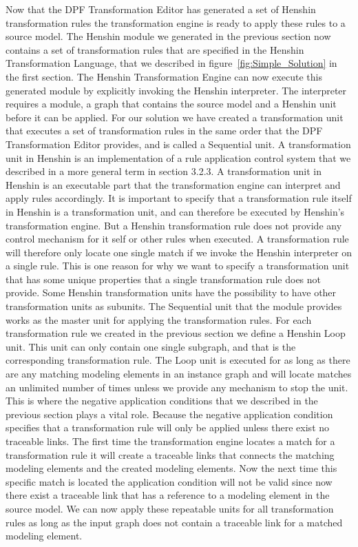 Now that the DPF Transformation Editor has generated a set of Henshin
transformation rules the transformation engine is ready to apply these rules to
a source model. The Henshin module we generated in the previous section now contains a set of
transformation rules that are specified in the Henshin Transformation Language,
that we described in figure~\ref{fig:Simple_Solution} in the first section. The
Henshin Transformation Engine can now execute this generated module by
explicitly invoking the Henshin interpreter. The interpreter requires a module,
a graph that contains the source model and a Henshin unit before it can be
applied. For our solution we have created a transformation unit that executes a
set of transformation rules in the same order that the DPF Transformation Editor
provides, and is called a Sequential unit. A transformation unit in Henshin is
an implementation of a rule application control system that we described in a
more general term in section 3.2.3. A transformation unit in Henshin is an
executable part that the transformation engine can interpret and apply rules
accordingly. It is important to specify that a transformation rule itself in
Henshin is a transformation unit, and can therefore be executed by Henshin's
transformation engine. But a Henshin transformation rule does not provide any
control mechanism for it self or other rules when executed.
A transformation rule will therefore only locate one single match if we
invoke the Henshin interpreter on a single rule. This is one reason for why we want to
specify a transformation unit that has some unique properties that a single
transformation rule does not provide. Some Henshin transformation units have the
possibility to have other transformation units as subunits.
The Sequential unit that the module provides works as the master unit for
applying the transformation rules. For each transformation rule we created in
the previous section we define a Henshin Loop unit. This unit can only contain
one single subgraph, and that is the corresponding transformation rule. The
Loop unit is executed for as long as there are any matching modeling elements
in an instance graph and will locate matches an unlimited number of times
unless we provide any mechanism to stop the unit. This is where the negative
application conditions that we described in the previous section plays a vital
role. Because the negative application condition specifies that a
transformation rule will only be applied unless there exist no traceable links.
The first time the transformation engine locates a match for a transformation
rule it will create a traceable links that connects the matching modeling
elements and the created modeling elements. Now the next time this specific
match is located the application condition will not be valid since now there
exist a traceable link that has a reference to a modeling element in the source
model. We can now apply these repeatable units for all transformation rules as
long as the input graph does not contain a traceable link for a matched
modeling element.

